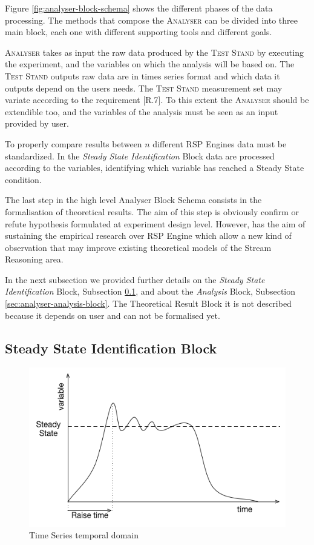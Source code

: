 Figure \ref{fig:analyser-block-schema} shows the different phases of the data processing. The methods that compose the \textsc{Analyser} can be divided into three main block, each one with different supporting tools and different goals.

\textsc{Analyser} takes as input the raw data produced by the \textsc{Test Stand} by executing the experiment, and the variables on which the analysis will be based on. The \textsc{Test Stand} outputs raw data are in times series format and which data it outputs depend on the users needs. The \textsc{Test Stand} measurement set may variate according to the requirement [R.7]. To this extent the \textsc{Analyser} should be extendible too, and the variables of the analysis must be seen as an input provided by \name user.

To properly compare results between $n$ different RSP Engines data must be standardized. In the \textit{Steady State Identification} Block data are processed according to the variables, identifying which variable has reached a Steady State condition.

The last step in the high level Analyser Block Schema consists in the formalisation of theoretical results. The aim of this step is obviously confirm or refute hypothesis formulated at experiment design level. However, \name has the aim of sustaining the empirical research over RSP Engine which allow a new kind of observation that may improve existing theoretical models of the Stream Reasoning area.

In the next subsection we provided further details on the \textit{Steady State Identification} Block, Subsection \ref{sec:analyser-ss-block}, and about the \textit{Analysis} Block, Subsection \ref{sec:analyser-analysis-block}. The Theoretical Result Block it is not described because it depends on \name user and can not be formalised yet.

\subsection{Steady State Identification Block}\label{sec:analyser-ss-block}

\begin{figure}[tbh]
  \centering
	\includegraphics[width=0.5\linewidth]{images/steady-state}
	\caption{Time Series temporal domain} 	
  	\label{fig:steady-state}
\end{figure}

